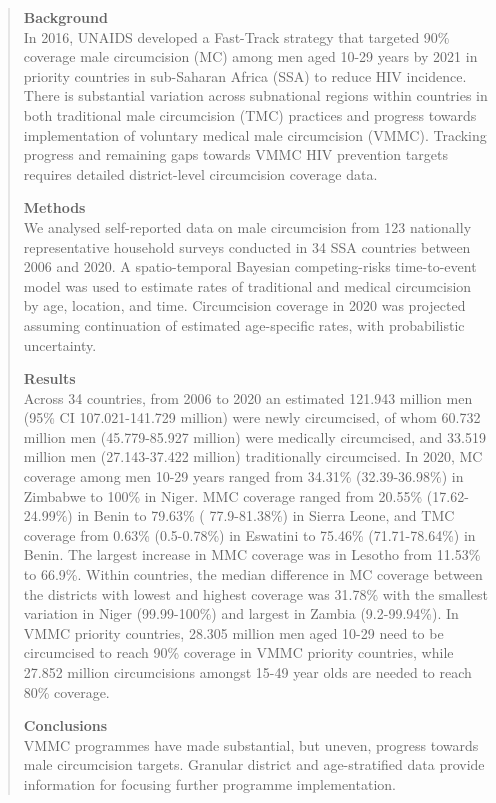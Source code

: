 \documentclass{article}
\begin{document}
\begin{abstract}
  \noindent \textbf{Background} \\
  \noindent In 2016, UNAIDS developed a Fast-Track strategy that targeted 90\% coverage male circumcision (MC) among men aged 10-29 years by 2021 in priority countries in sub-Saharan Africa (SSA) to reduce HIV incidence.
  There is substantial variation across subnational regions within countries in both traditional male circumcision (TMC) practices and progress towards implementation of voluntary medical male circumcision (VMMC). 
  Tracking progress and remaining gaps towards VMMC HIV prevention targets requires detailed district-level circumcision coverage data.

  \noindent \textbf{Methods} \\
  \noindent We analysed self-reported data on male circumcision from 123 nationally representative household surveys conducted in 34 SSA countries between 2006 and 2020. 
  A spatio-temporal Bayesian competing-risks time-to-event model was used to estimate rates of traditional and medical circumcision by age, location, and time. 
  Circumcision coverage in 2020 was projected assuming continuation of estimated age-specific rates, with probabilistic uncertainty.

  \noindent \textbf{Results} \\
  \noindent Across 34 countries, from 2006 to 2020 an estimated 121.943 million men (95\% CI 107.021-141.729 million) were newly circumcised, of whom 60.732 million men (45.779-85.927 million) were medically circumcised, and 33.519 million men (27.143-37.422 million) traditionally circumcised. 
  In 2020, MC coverage among men 10-29 years ranged from 34.31\% (32.39-36.98\%) in Zimbabwe to 100\% in Niger. 
  MMC coverage ranged from 20.55\% (17.62- 24.99\%) in Benin to 79.63\% ( 77.9-81.38\%) in Sierra Leone, and TMC coverage from 0.63\% (0.5-0.78\%) in Eswatini to 75.46\% (71.71-78.64\%) in Benin. The largest increase in MMC coverage was in Lesotho from 11.53\% to 66.9\%. 
  Within countries, the median difference in MC coverage between the districts with lowest and highest coverage was 31.78\% with the smallest variation in Niger (99.99-100\%) and largest in Zambia (9.2-99.94\%). In VMMC priority countries, 28.305
  million men aged 10-29 need to be circumcised to reach 90\% coverage in VMMC priority countries, while 27.852 million circumcisions amongst 15-49 year olds are needed to reach 80\% coverage.
  
  \noindent \textbf{Conclusions} \\
  \noindent VMMC programmes have made substantial, but uneven, progress towards male circumcision targets. Granular district and age-stratified data provide information for focusing further programme implementation.

\end{abstract}
\end{document}
